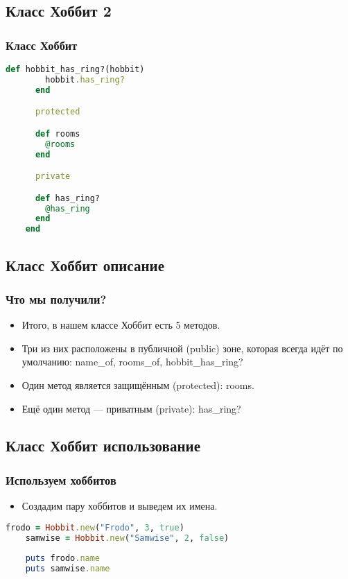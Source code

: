 \documentclass[compress,red]{beamer}
\begin{document}
\subsection{Класс Хоббит 2}
\begin{frame}[fragile]
  \frametitle{Класс Хоббит}
  \scriptsize{
  \begin{lstlisting}[language=ruby,basicstyle=\footnotesize,label=ruby2,caption=Класс Хоббит]
      def hobbit_has_ring?(hobbit)
        hobbit.has_ring?
      end

      protected

      def rooms
        @rooms
      end

      private

      def has_ring?
        @has_ring
      end
    end
  \end{lstlisting}
  }
\end{frame}

\subsection{Класс Хоббит описание}
\begin{frame}[fragile]
  \frametitle{Что мы получили?}
  \begin{itemize}
    \item Итого, в нашем классе Хоббит есть 5 методов.
    \item Три из них расположены в публичной (public) зоне, которая всегда идёт по умолчанию: name\_of, rooms\_of, hobbit\_has\_ring?
    \item Один метод является защищённым (protected): rooms.
    \item Ещё один метод --- приватным (private): has\_ring?
  \end{itemize}
\end{frame}

\subsection{Класс Хоббит использование}
\begin{frame}[fragile]
  \frametitle{Используем хоббитов}
  \begin{itemize}
    \item Создадим пару хоббитов и выведем их имена.
  \end{itemize}
  \scriptsize{
  \begin{lstlisting}[language=ruby,basicstyle=\footnotesize,label=ruby3,caption=Использование Хоббита]
    frodo = Hobbit.new("Frodo", 3, true)
    samwise = Hobbit.new("Samwise", 2, false)
    
    puts frodo.name
    puts samwise.name
  \end{lstlisting}
  }
\end{frame}
\end{document}
